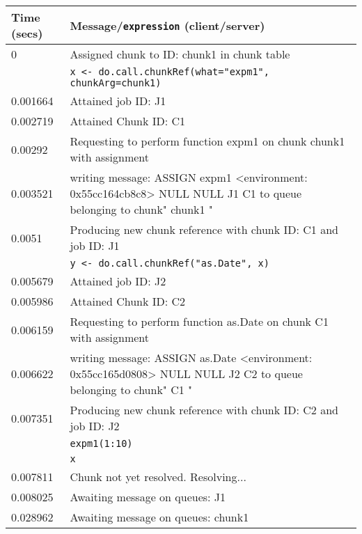 \documentclass[a4paper,10pt]{article}
\begin{document}
\begin{table}
	\def\clientcolour{mybrown}
	\def\servercolour{mynavy}
	\centering
	\begin{tabularx}{\textwidth}{lX}
		\toprule
		Time (secs)  & Message/\texttt{expression} (\textcolor{\clientcolour}{client}/\textcolor{\servercolour}{server}) \\
		\midrule
		0        & \textcolor{\servercolour}{Assigned chunk to ID: chunk1 in chunk table} \\
			 & \textcolor{\clientcolour}{\texttt{x <- do.call.chunkRef(what="expm1", chunkArg=chunk1)} } \\
		0.001664 & \textcolor{\clientcolour}{Attained job ID:  J1} \\
		0.002719 & \textcolor{\clientcolour}{Attained Chunk ID:  C1} \\
		0.00292  & \textcolor{\clientcolour}{Requesting to perform function expm1 on chunk chunk1 with assignment} \\
		0.003521 & \textcolor{\clientcolour}{writing message: ASSIGN expm1 <environment: 0x55cc164cb8c8> NULL NULL J1 C1 to queue belonging to chunk" chunk1 "} \\
		0.0051   & \textcolor{\clientcolour}{Producing new chunk reference with chunk ID: C1 and job ID: J1} \\
			 & \textcolor{\clientcolour}{\texttt{y <- do.call.chunkRef("as.Date", x)}} \\
		0.005679 & \textcolor{\clientcolour}{Attained job ID:  J2} \\
		0.005986 & \textcolor{\clientcolour}{Attained Chunk ID:  C2} \\
		0.006159 & \textcolor{\clientcolour}{Requesting to perform function as.Date on chunk C1 with assignment} \\
		0.006622 & \textcolor{\clientcolour}{writing message: ASSIGN as.Date <environment: 0x55cc165d0808> NULL NULL J2 C2 to queue belonging to chunk" C1 "} \\
		0.007351 & \textcolor{\clientcolour}{Producing new chunk reference with chunk ID: C2 and job ID: J2} \\
			 & \textcolor{\clientcolour}{\texttt{expm1(1:10)}} \\
			 & \textcolor{\clientcolour}{\texttt{x}} \\
		0.007811 & \textcolor{\clientcolour}{Chunk not yet resolved. Resolving...} \\
		0.008025 & \textcolor{\clientcolour}{Awaiting message on queues: J1} \\
		0.028962 & \textcolor{\servercolour}{Awaiting message on queues: chunk1} \\

\end{tabularx}
\end{table}
\end{document}
